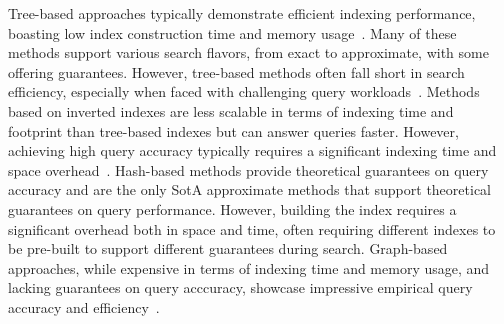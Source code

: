  Tree-based approaches typically demonstrate efficient indexing performance, boasting low index construction time and memory usage~\cite{lernaeanhydra2,elpis,tptree}. 
Many of these methods support various search flavors, from exact to approximate, with some offering guarantees. However, tree-based methods often fall short in search efficiency, especially when faced with challenging query workloads~\cite{lernaeanhydra2}. 
Methods based on inverted indexes are less scalable in terms of indexing time and footprint than tree-based indexes but can answer queries faster. 
However, achieving high query accuracy typically requires a significant indexing time and space overhead~\cite{lernaeanhydra2}. 
Hash-based methods provide theoretical guarantees on query accuracy and are the only SotA approximate methods that support theoretical guarantees on query performance. 
However, building the index requires a significant overhead both in space and time, often requiring different indexes to be pre-built to support different guarantees during search. 
Graph-based approaches, while expensive in terms of indexing time and memory usage, and lacking guarantees on query acccuracy, showcase impressive empirical query accuracy and efficiency~\cite{lernaeanhydra2, elpis, lin19, dpg}. 

